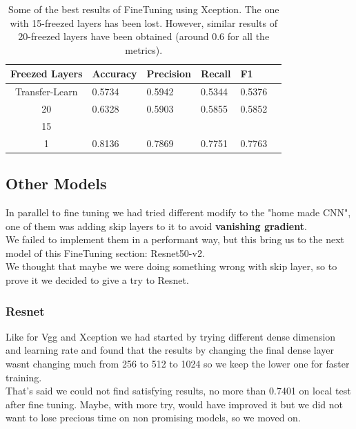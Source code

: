 \documentclass[10pt]{article}
\begin{document}
\begin{table}[ht]
  \centering
  \begin{adjustbox}{width=240}
  \small
  \begin{tabular}{|c|l|l|l|l|l}
  
  \hline \bf Freezed Layers & \bf Accuracy & \bf Precision & \bf Recall & \bf F1 \\ \hline
  Transfer-Learn & 0.5734 & 0.5942 & 0.5344 & 0.5376\\
  20 & 0.6328 & 0.5903 & 0.5855 & 0.5852\\
  15 &  &  &  & \\
  1 & 0.8136 & 0.7869 & 0.7751 & 0.7763\\
  \hline
  \end{tabular}
  \end{adjustbox}
  \caption{Some of the best results of FineTuning using Xception. The one with 15-freezed layers has been lost. However, similar results of 20-freezed layers have been obtained (around 0.6 for all the metrics).}
  \end{table}
\subsection{Other Models}
In parallel to fine tuning we had tried different modify to the "home made CNN", one of them was adding skip layers to it to avoid \textbf{vanishing gradient}.\\
We failed to implement them in a performant way, but this bring us to the next model of this FineTuning section: Resnet50-v2.\\
We thought that maybe we were doing something wrong with skip layer, so to prove it we decided to give a try to Resnet.
\subsubsection{Resnet}
Like for Vgg and Xception we had started by trying different dense dimension and learning rate and found that the results by changing the final dense layer wasnt changing much from 256 to 512 to 1024 so we keep the lower one for faster training.\\
That's said we could not find satisfying results, no more than 0.7401 on local test after fine tuning.
Maybe, with more try, would have improved it but we did not want to lose precious time on non promising models, so we moved on.
\end{document}

